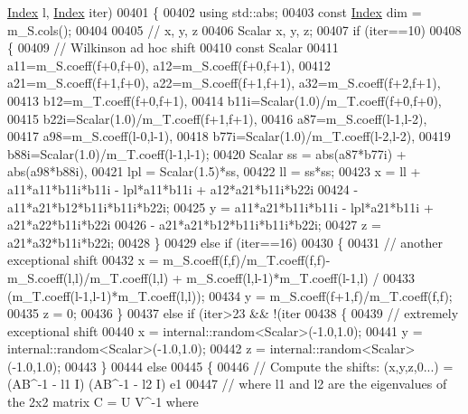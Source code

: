 \begin{DoxyCode}
      \hyperlink{group___eigenvalues___module_a6201e534e901b5f4e66f72c176b534a3}{Index} l, \hyperlink{group___eigenvalues___module_a6201e534e901b5f4e66f72c176b534a3}{Index} iter)
00401     \{
00402       \textcolor{keyword}{using} std::abs;
00403       \textcolor{keyword}{const} \hyperlink{group___eigenvalues___module_a6201e534e901b5f4e66f72c176b534a3}{Index} dim = m\_S.cols();
00404 
00405       \textcolor{comment}{// x, y, z}
00406       Scalar x, y, z;
00407       \textcolor{keywordflow}{if} (iter==10)
00408       \{
00409         \textcolor{comment}{// Wilkinson ad hoc shift}
00410         \textcolor{keyword}{const} Scalar
00411           a11=m\_S.coeff(f+0,f+0), a12=m\_S.coeff(f+0,f+1),
00412           a21=m\_S.coeff(f+1,f+0), a22=m\_S.coeff(f+1,f+1), a32=m\_S.coeff(f+2,f+1),
00413           b12=m\_T.coeff(f+0,f+1),
00414           b11i=Scalar(1.0)/m\_T.coeff(f+0,f+0),
00415           b22i=Scalar(1.0)/m\_T.coeff(f+1,f+1),
00416           a87=m\_S.coeff(l-1,l-2),
00417           a98=m\_S.coeff(l-0,l-1),
00418           b77i=Scalar(1.0)/m\_T.coeff(l-2,l-2),
00419           b88i=Scalar(1.0)/m\_T.coeff(l-1,l-1);
00420         Scalar ss = abs(a87*b77i) + abs(a98*b88i),
00421                lpl = Scalar(1.5)*ss,
00422                ll = ss*ss;
00423         x = ll + a11*a11*b11i*b11i - lpl*a11*b11i + a12*a21*b11i*b22i
00424           - a11*a21*b12*b11i*b11i*b22i;
00425         y = a11*a21*b11i*b11i - lpl*a21*b11i + a21*a22*b11i*b22i 
00426           - a21*a21*b12*b11i*b11i*b22i;
00427         z = a21*a32*b11i*b22i;
00428       \}
00429       \textcolor{keywordflow}{else} \textcolor{keywordflow}{if} (iter==16)
00430       \{
00431         \textcolor{comment}{// another exceptional shift}
00432         x = m\_S.coeff(f,f)/m\_T.coeff(f,f)-m\_S.coeff(l,l)/m\_T.coeff(l,l) + m\_S.coeff(l,l-1)*m\_T.coeff(l-1,l)
       /
00433           (m\_T.coeff(l-1,l-1)*m\_T.coeff(l,l));
00434         y = m\_S.coeff(f+1,f)/m\_T.coeff(f,f);
00435         z = 0;
00436       \}
00437       \textcolor{keywordflow}{else} \textcolor{keywordflow}{if} (iter>23 && !(iter%
00438       \{
00439         \textcolor{comment}{// extremely exceptional shift}
00440         x = internal::random<Scalar>(-1.0,1.0);
00441         y = internal::random<Scalar>(-1.0,1.0);
00442         z = internal::random<Scalar>(-1.0,1.0);
00443       \}
00444       \textcolor{keywordflow}{else}
00445       \{
00446         \textcolor{comment}{// Compute the shifts: (x,y,z,0...) = (AB^-1 - l1 I) (AB^-1 - l2 I) e1}
00447         \textcolor{comment}{// where l1 and l2 are the eigenvalues of the 2x2 matrix C = U V^-1 where}

\end{DoxyCode}
